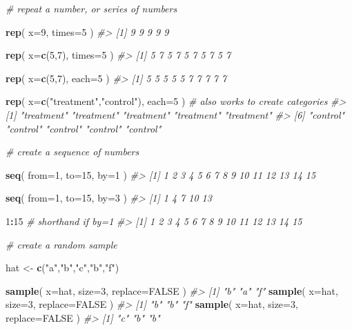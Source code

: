 \documentclass[]{book}
\newenvironment{Shaded}{\begin{snugshade}}{\end{snugshade}}
\newcommand{\CommentTok}[1]{\textcolor[rgb]{0.56,0.35,0.01}{\textit{#1}}}
\newcommand{\DataTypeTok}[1]{\textcolor[rgb]{0.13,0.29,0.53}{#1}}
\newcommand{\DecValTok}[1]{\textcolor[rgb]{0.00,0.00,0.81}{#1}}
\newcommand{\KeywordTok}[1]{\textcolor[rgb]{0.13,0.29,0.53}{\textbf{#1}}}
\newcommand{\NormalTok}[1]{#1}
\newcommand{\OperatorTok}[1]{\textcolor[rgb]{0.81,0.36,0.00}{\textbf{#1}}}
\newcommand{\OtherTok}[1]{\textcolor[rgb]{0.56,0.35,0.01}{#1}}
\newcommand{\StringTok}[1]{\textcolor[rgb]{0.31,0.60,0.02}{#1}}
\theoremstyle{definition}
\theoremstyle{definition}
\theoremstyle{definition}
\theoremstyle{remark}
\begin{document}
\begin{Shaded}
\begin{Highlighting}[]

\CommentTok{# repeat a number, or series of numbers}

\KeywordTok{rep}\NormalTok{( }\DataTypeTok{x=}\DecValTok{9}\NormalTok{, }\DataTypeTok{times=}\DecValTok{5}\NormalTok{ )}
\CommentTok{#> [1] 9 9 9 9 9}

\KeywordTok{rep}\NormalTok{( }\DataTypeTok{x=}\KeywordTok{c}\NormalTok{(}\DecValTok{5}\NormalTok{,}\DecValTok{7}\NormalTok{), }\DataTypeTok{times=}\DecValTok{5}\NormalTok{ )}
\CommentTok{#>  [1] 5 7 5 7 5 7 5 7 5 7}

\KeywordTok{rep}\NormalTok{( }\DataTypeTok{x=}\KeywordTok{c}\NormalTok{(}\DecValTok{5}\NormalTok{,}\DecValTok{7}\NormalTok{), }\DataTypeTok{each=}\DecValTok{5}\NormalTok{ )}
\CommentTok{#>  [1] 5 5 5 5 5 7 7 7 7 7}

\KeywordTok{rep}\NormalTok{( }\DataTypeTok{x=}\KeywordTok{c}\NormalTok{(}\StringTok{"treatment"}\NormalTok{,}\StringTok{"control"}\NormalTok{), }\DataTypeTok{each=}\DecValTok{5}\NormalTok{ )  }\CommentTok{# also works to create categories}
\CommentTok{#>  [1] "treatment" "treatment" "treatment" "treatment" "treatment"}
\CommentTok{#>  [6] "control"   "control"   "control"   "control"   "control"}


\CommentTok{# create a sequence of numbers}

\KeywordTok{seq}\NormalTok{( }\DataTypeTok{from=}\DecValTok{1}\NormalTok{, }\DataTypeTok{to=}\DecValTok{15}\NormalTok{, }\DataTypeTok{by=}\DecValTok{1}\NormalTok{ )}
\CommentTok{#>  [1]  1  2  3  4  5  6  7  8  9 10 11 12 13 14 15}

\KeywordTok{seq}\NormalTok{( }\DataTypeTok{from=}\DecValTok{1}\NormalTok{, }\DataTypeTok{to=}\DecValTok{15}\NormalTok{, }\DataTypeTok{by=}\DecValTok{3}\NormalTok{ )}
\CommentTok{#> [1]  1  4  7 10 13}

\DecValTok{1}\OperatorTok{:}\DecValTok{15}   \CommentTok{# shorthand if by=1}
\CommentTok{#>  [1]  1  2  3  4  5  6  7  8  9 10 11 12 13 14 15}



\CommentTok{# create a random sample}

\NormalTok{hat <-}\StringTok{ }\KeywordTok{c}\NormalTok{(}\StringTok{"a"}\NormalTok{,}\StringTok{"b"}\NormalTok{,}\StringTok{"c"}\NormalTok{,}\StringTok{"b"}\NormalTok{,}\StringTok{"f"}\NormalTok{)}

\KeywordTok{sample}\NormalTok{( }\DataTypeTok{x=}\NormalTok{hat, }\DataTypeTok{size=}\DecValTok{3}\NormalTok{, }\DataTypeTok{replace=}\OtherTok{FALSE}\NormalTok{ )}
\CommentTok{#> [1] "b" "a" "f"}
\KeywordTok{sample}\NormalTok{( }\DataTypeTok{x=}\NormalTok{hat, }\DataTypeTok{size=}\DecValTok{3}\NormalTok{, }\DataTypeTok{replace=}\OtherTok{FALSE}\NormalTok{ )}
\CommentTok{#> [1] "b" "b" "f"}
\KeywordTok{sample}\NormalTok{( }\DataTypeTok{x=}\NormalTok{hat, }\DataTypeTok{size=}\DecValTok{3}\NormalTok{, }\DataTypeTok{replace=}\OtherTok{FALSE}\NormalTok{ )}
\CommentTok{#> [1] "c" "b" "b"}


\end{Highlighting}
\end{Shaded}
\end{document}
